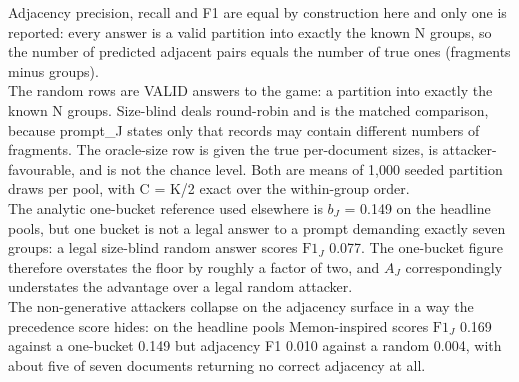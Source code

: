 \begin{table}[t]
\begin{flushleft}
Adjacency precision, recall and F1 are equal by construction here and only one is reported: every answer is a valid partition into exactly the known N groups, so the number of predicted adjacent pairs equals the number of true ones (fragments minus groups).\\
The random rows are VALID answers to the game: a partition into exactly the known N groups. Size-blind deals round-robin and is the matched comparison, because \textsf{prompt\_J} states only that records may contain different numbers of fragments. The oracle-size row is given the true per-document sizes, is attacker-favourable, and is not the chance level. Both are means of 1,000 seeded partition draws per pool, with C = K/2 exact over the within-group order.\\
The analytic one-bucket reference used elsewhere is $b_{J}$ = 0.149 on the headline pools, but one bucket is not a legal answer to a prompt demanding exactly seven groups: a legal size-blind random answer scores $\mathrm{F1}_{J}$ 0.077. The one-bucket figure therefore overstates the floor by roughly a factor of two, and $A_{J}$ correspondingly understates the advantage over a legal random attacker.\\
The non-generative attackers collapse on the adjacency surface in a way the precedence score hides: on the headline pools Memon-inspired scores $\mathrm{F1}_{J}$ 0.169 against a one-bucket 0.149 but adjacency F1 0.010 against a random 0.004, with about five of seven documents returning no correct adjacency at all.\\
\end{flushleft}
\end{table}
